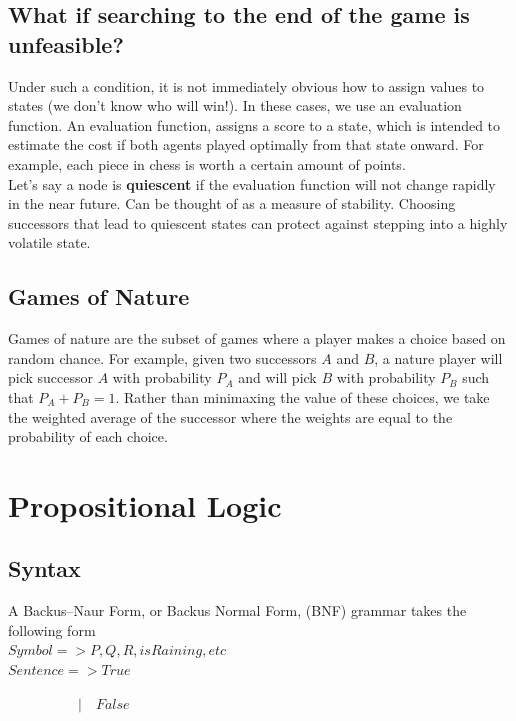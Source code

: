 \documentclass[letterpaper]{article} %
\begin{document}
\subsection{What if searching to the end of the game is unfeasible?}

Under such a condition, it is not immediately obvious how to assign values to states (we don't know who will win!). In these cases, we use an evaluation function. An evaluation function, assigns a score to a state, which is intended to estimate the cost if both agents played optimally from that state onward. For example, each piece in chess is worth a certain amount of points.\\

Let's say a node is \textbf{quiescent} if the evaluation function will not change rapidly in the near future. Can be thought of as a measure of stability. Choosing successors that lead to quiescent states can protect against stepping into a highly volatile state.

\subsection{Games of Nature}

Games of nature are the subset of games where a player makes a choice based on random chance. For example, given two successors $A$ and $B$, a nature player will pick successor $A$ with probability $P_A$ and will pick $B$ with probability $P_B$ such that $P_A + P_B = 1$. Rather than minimaxing the value of these choices, we take the weighted average of the successor where the weights are equal to the probability of each choice. 

\section{Propositional Logic}

\subsection{Syntax}

A Backus–Naur Form, or Backus Normal Form, (BNF) grammar takes the following form\\

$Symbol => P, Q, R, isRaining, etc$\\

$Sentence => True$

$\quad\quad\quad\quad\quad | \quad False$
\end{document}

